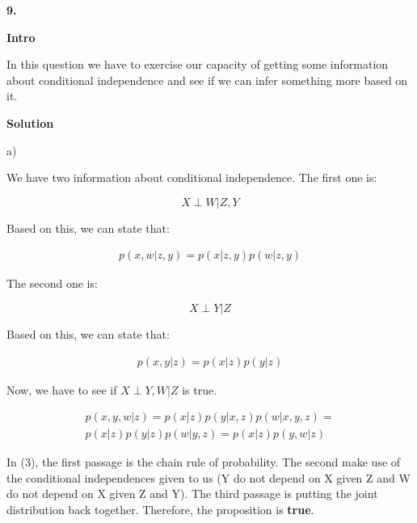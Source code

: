 \documentclass[a4paper,10pt]{book}
\begin{document}
\textbf{9.}

\textbf{Intro} \par
In this question we have to exercise our capacity of getting some information about
conditional independence and see if we can infer something more based on it.\par


\textbf{Solution} \par

a)

We have two information about conditional independence. The first one is:

\[X \perp W | Z, Y\]

Based on this, we can state that:

\begin{equation}
\begin{split}
p(x, w | z, y) = p(x| z, y)p(w| z, y)
\end{split}
\end{equation}

The second one is:

\[X \perp Y | Z\]

Based on this, we can state that:

\begin{equation}
\begin{split}
p(x, y | z) = p(x|z)p(y|z)
\end{split}
\end{equation}

Now, we have to see if $X \perp Y, W | Z$ is true.

\begin{equation}
\begin{split}
p(x,y,w|z) = p(x|z)p(y|x,z)p(w|x,y,z) = \\
p(x|z)p(y|z)p(w|y,z) = p(x|z)p(y,w|z)
\end{split}
\end{equation}

In (3), the first passage is the chain rule of probability. The second 
make use of the conditional independences given to us (Y do not depend on X given Z and W do not 
depend on X given Z and Y). The third passage is putting the joint distribution back together.
Therefore, the proposition is \textbf{true}.\par
\end{document}
